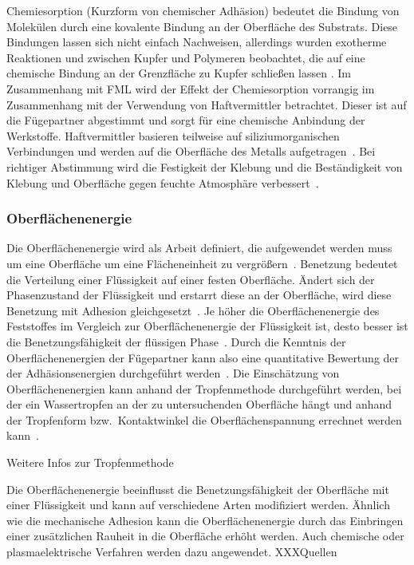 Chemiesorption (Kurzform von chemischer Adhäsion) bedeutet die Bindung von Molekülen durch eine kovalente Bindung an der Oberfläche des Substrats.
Diese Bindungen lassen sich nicht einfach Nachweisen, allerdings wurden exotherme Reaktionen und zwischen Kupfer und Polymeren beobachtet, die auf eine chemische Bindung an der Grenzfläche zu Kupfer schließen lassen \cite{Schroer.1994}.
Im Zusammenhang mit FML wird der Effekt der Chemiesorption vorrangig im Zusammenhang mit der Verwendung von Haftvermittler betrachtet.
Dieser ist auf die Fügepartner abgestimmt und sorgt für eine chemische Anbindung der Werkstoffe.
Haftvermittler basieren teilweise auf siliziumorganischen Verbindungen und werden auf die Oberfläche des Metalls aufgetragen~\cite{Zucchi.2006}.
Bei richtiger Abstimmung wird die Festigkeit der Klebung und die Beständigkeit von Klebung und Oberfläche gegen feuchte Atmosphäre verbessert~\cite{Habenicht.2009}.

\subsubsection{Oberflächenenergie}\label{subsubsec:eoberfläche}

Die Oberflächenenergie wird als Arbeit definiert, die aufgewendet werden muss um eine Oberfläche um eine Flächeneinheit zu vergrößern~\cite{Flock.b}.
Benetzung bedeutet die Verteilung einer Flüssigkeit auf einer festen Oberfläche.
Ändert sich der Phasenzustand der Flüssigkeit und erstarrt diese an der Oberfläche, wird diese Benetzung mit Adhesion gleichgesetzt~\cite{Habenicht.2009}.
Je höher die Oberflächenenergie des Feststoffes im Vergleich zur Oberflächenenergie der Flüssigkeit ist, desto besser ist die Benetzungsfähigkeit der flüssigen Phase~\cite{Flock.b}.
Durch die Kenntnis der Oberflächenenergien der Fügepartner kann also eine quantitative Bewertung der der Adhäsionsenergien durchgeführt werden~\cite{Nikolova.2005}.
Die Einschätzung von Oberflächenenergien kann anhand der Tropfenmethode durchgeführt werden, bei der ein Wassertropfen an der zu untersuchenden Oberfläche hängt und anhand der Tropfenform bzw.\ Kontaktwinkel die Oberflächenspannung errechnet werden kann~\cite{Flock.b}.

Weitere Infos zur Tropfenmethode

Die Oberflächenenergie beeinflusst die Benetzungsfähigkeit der Oberfläche mit einer Flüssigkeit und kann auf verschiedene Arten modifiziert werden.
Ähnlich wie die mechanische Adhesion kann die Oberflächenenergie durch das Einbringen einer zusätzlichen Rauheit in die Oberfläche erhöht werden.
Auch chemische oder plasmaelektrische Verfahren werden dazu angewendet. XXXQuellen

